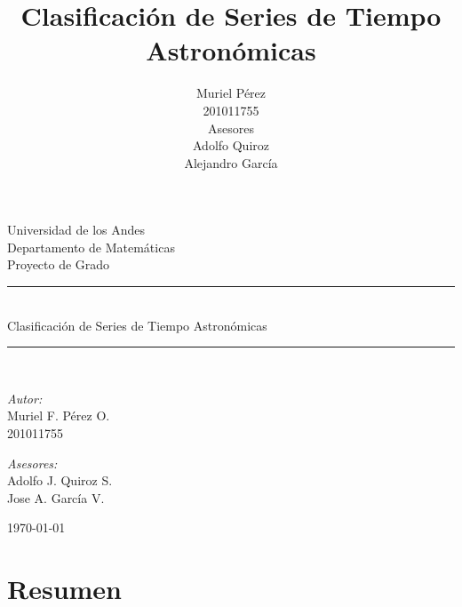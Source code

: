 \documentclass[letterpaper,12pt]{book}
\title{Clasificación de Series de Tiempo Astronómicas}
\author{Muriel Pérez\\ 201011755 \\
  Asesores\\
Adolfo Quiroz \\
Alejandro García}
\newcommand{\HRule}{\rule{\linewidth}{0.5mm}}
\begin{document}
\maketitle

\begin{titlepage}
\begin{center}


\huge Universidad de los Andes\\[1.5cm]

\Large Departamento de Matemáticas\\[1.5cm]

\large Proyecto de Grado\\[0.5cm]

\HRule \\[0.4cm]
{ \Large Clasificación de Series de Tiempo Astronómicas \\[0.4cm] }

\HRule \\[1.5cm]

\noindent
\begin{minipage}[t]{0.4\textwidth}
\begin{flushleft} \large
\emph{Autor:}\\
Muriel F. Pérez O. \\
201011755
\end{flushleft}
\end{minipage}%
\begin{minipage}[t]{0.6\textwidth}
\begin{flushright} \large
\emph{Asesores:} \\
Adolfo J. Quiroz S. \\
Jose A. García V.
\end{flushright}
\end{minipage}

\vfill

{\large \today}

\end{center}
\end{titlepage}
\chapter*{Resumen}
\end{document}
